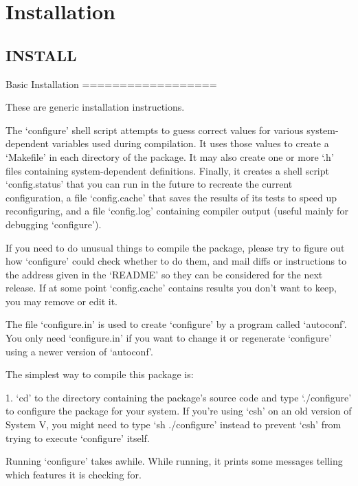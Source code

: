 \section{\-Installation}
\label{group__install}
\subsection{\-I\-N\-S\-T\-A\-L\-L}\label{group__install_install}

\begin{DoxyCodeInclude}
Basic Installation
==================

   These are generic installation instructions.

   The `configure' shell script attempts to guess correct values for
various system-dependent variables used during compilation.  It uses
those values to create a `Makefile' in each directory of the package.
It may also create one or more `.h' files containing system-dependent
definitions.  Finally, it creates a shell script `config.status' that
you can run in the future to recreate the current configuration, a file
`config.cache' that saves the results of its tests to speed up
reconfiguring, and a file `config.log' containing compiler output
(useful mainly for debugging `configure').

   If you need to do unusual things to compile the package, please try
to figure out how `configure' could check whether to do them, and mail
diffs or instructions to the address given in the `README' so they can
be considered for the next release.  If at some point `config.cache'
contains results you don't want to keep, you may remove or edit it.

   The file `configure.in' is used to create `configure' by a program
called `autoconf'.  You only need `configure.in' if you want to change
it or regenerate `configure' using a newer version of `autoconf'.

The simplest way to compile this package is:

  1. `cd' to the directory containing the package's source code and type
     `./configure' to configure the package for your system.  If you're
     using `csh' on an old version of System V, you might need to type
     `sh ./configure' instead to prevent `csh' from trying to execute
     `configure' itself.

     Running `configure' takes awhile.  While running, it prints some
     messages telling which features it is checking for.


\end{DoxyCodeInclude}
